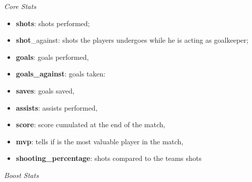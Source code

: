 \begin{center}
    \textit{Core Stats}
\end{center}
\begin{itemize}
    \item \textbf{shots}: shots performed;
    \item \textbf{shot}\_against: shots the players undergoes while he is acting as goalkeeper;
    \item \textbf{goals}: goals performed,
    \item \textbf{goals\_against}: goals taken: 
    \item \textbf{saves}: goals saved,
    \item \textbf{assists}: assists performed,
    \item \textbf{score}: score cumulated at the end of the match,
    \item \textbf{mvp}: tells if is the most valuable player in the match,
    \item \textbf{shooting\_percentage}: shots compared to the teams shots
\end{itemize}
\begin{center}
    \textit{Boost Stats}
\end{center}
